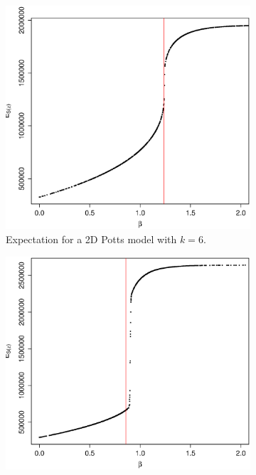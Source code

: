 \documentclass[nojss,shortnames]{jss}\usepackage[]{graphicx}\usepackage[]{color}
\begin{document}
\begin{figure}
        \centering
        \begin{subfigure}{0.45\textwidth}
                \includegraphics[width=\textwidth]{bcrit2d.eps}
                \caption{Expectation for a 2D Potts model with $k = 6$.}
                \label{f:bcrit2d}
        \end{subfigure}%
\qquad
        \begin{subfigure}{0.45\textwidth}
                \includegraphics[width=\textwidth]{bcrit3d.eps}

\end{subfigure}
\end{figure}
\end{document}
